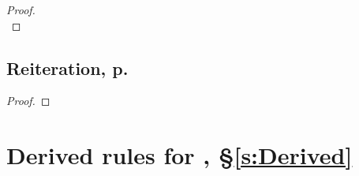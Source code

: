 \begin{multicols}{2}
\begin{proof}
\\	
	 
\end{proof}

\subsection{Reiteration, p.\ \pageref{reit}}

\begin{proof}
	 
\end{proof}


\end{multicols}


\section*{Derived rules for \TFL, §\ref{s:Derived}}
